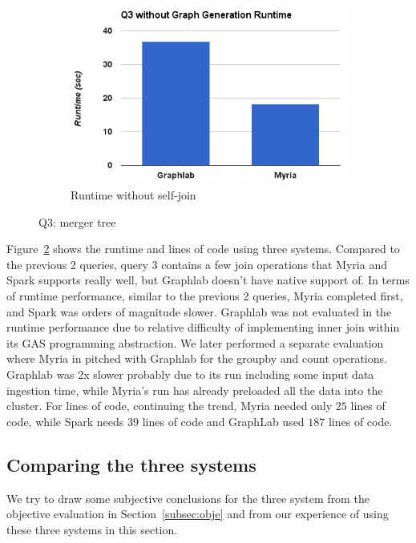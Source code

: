 \begin{figure}[t]
\begin{subfigure}{0.7\linewidth}
      \includegraphics[width=\textwidth]{images/q3_runtime2.png}
      
        \caption{Runtime without self-join}
        \label{fig:q3_runtime2}
        \end{subfigure}
\caption{Q3: merger tree}
\label{fig:q3}
\end{figure}

Figure~\ref{fig:q3} shows the runtime and lines of code using three systems. Compared to the previous 2 queries, query 3 contains a few join operations that Myria and Spark supports really well, but Graphlab doesn't have native support of. In terms of runtime performance, similar to the previous 2 queries, Myria completed first, and Spark was orders of magnitude slower. Graphlab was not evaluated in the runtime performance due to relative difficulty of implementing inner join within its GAS programming abstraction. We later performed a separate evaluation where Myria in pitched with Graphlab for the groupby and count operations. Graphlab was 2x slower probably due to its run including some input data ingestion time, while Myria's run has already preloaded all the data into the cluster. For lines of code, continuing the trend, Myria needed only $25$ lines of code, while
Spark needs $39$ lines of code and GraphLab used $187$ lines of code.




\subsection{Comparing the three systems}
\label{sec:comp}
We try to draw some subjective conclusions for 
the three system from the objective evaluation 
in Section~\ref{subsec:obje} and from our experience of using these three systems in this section.

